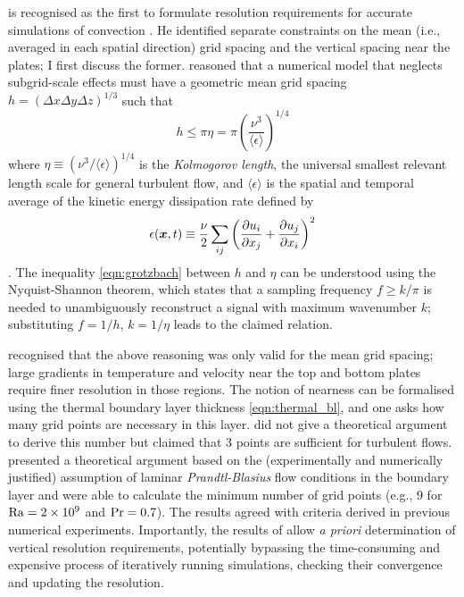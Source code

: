 \documentclass[../main.tex]{subfiles}
\begin{document}
\textcite{grotzbach1983} is recognised as the first to formulate resolution
requirements for accurate simulations of \rb{} convection
\parencite{chilla2012,scheel2013}. He identified separate constraints on the
mean (i.e., averaged in each spatial direction) grid spacing and the vertical
spacing near the plates; I first discuss the former. \citeauthor{grotzbach1983}
reasoned that a numerical model that neglects subgrid-scale effects must have a
geometric mean grid spacing $h = (\Delta x \Delta y \Delta z)^{1/3}$ such that
\begin{equation}
    \label{eqn:grotzbach}
    h \leq \pi \eta = \pi \left(
        \frac{\nu^3}{\langle \epsilon \rangle}
    \right)^{1/4}
\end{equation}
where $\eta \equiv (\nu^3/\langle \epsilon \rangle)^{1/4}$ is the
\emph{Kolmogorov length}, the universal smallest relevant length scale for
general turbulent flow, and $\langle \epsilon \rangle$ is the spatial and
temporal average of the kinetic energy dissipation rate defined by
\begin{equation}
    \label{eqn:kinetic_dissipation}
    \epsilon(\bm{x}, t) \equiv \frac{\nu}{2} \sum_{ij} \left(
        \frac{\partial u_i}{\partial x_j} + \frac{\partial u_j}{\partial x_i}
    \right)^2
\end{equation}
\parencite{chilla2012}. The inequality \cref{eqn:grotzbach} between $h$ and
$\eta$ can be understood using the Nyquist-Shannon theorem, which states that a
sampling frequency $f \geq k/\pi$ is needed to unambiguously reconstruct a
signal with maximum wavenumber $k$; substituting $f = 1/h$, $k = 1/\eta$ leads
to the claimed relation.

\citeauthor{grotzbach1983} recognised that the above reasoning was only valid
for the mean grid spacing; large gradients in temperature and velocity near the
top and bottom plates require finer resolution in those regions. The notion of
nearness can be formalised using the thermal boundary layer thickness
\cref{eqn:thermal_bl}, and one asks how many grid points are necessary in this
layer. \citeauthor{grotzbach1983} did not give a theoretical argument to derive
this number but claimed that 3 points are sufficient for turbulent flows.
\textcite{shishkina2010} presented a theoretical argument based on the
(experimentally and numerically justified) assumption of laminar
\emph{Prandtl-Blasius} flow conditions in the boundary layer and were able to
calculate the minimum number of grid points (e.g., 9 for $\mathrm{Ra} =
\SI{2e9}{}$ and $\mathrm{Pr} = 0.7$). The results agreed with criteria derived in
previous numerical experiments. Importantly, the results of
\citeauthor{shishkina2010} allow \emph{a priori} determination of vertical
resolution requirements, potentially bypassing the time-consuming and expensive
process of iteratively running simulations, checking their convergence and
updating the resolution.
\end{document}
